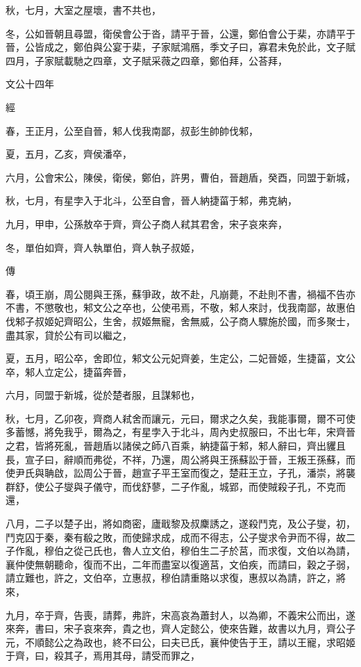 \documentclass{ctexart}
\begin{document}
秋，七月，大室之屋壞，書不共也，

冬，公如晉朝且尋盟，衛侯會公于沓，請平于晉，公還，鄭伯會公于棐，亦請平于晉，公皆成之，鄭伯與公宴于棐，子家賦鴻鴈，季文子曰，寡君未免於此，文子賦四月，子家賦載馳之四章，文子賦采薇之四章，鄭伯拜，公荅拜，





文公十四年


經



春，王正月，公至自晉，邾人伐我南鄙，叔彭生帥帥伐邾，

夏，五月，乙亥，齊侯潘卒，

六月，公會宋公，陳侯，衛侯，鄭伯，許男，曹伯，晉趙盾，癸酉，同盟于新城，

秋，七月，有星孛入于北斗，公至自會，晉人納捷菑于邾，弗克納，

九月，甲申，公孫敖卒于齊，齊公子商人弒其君舍，宋子哀來奔，

冬，單伯如齊，齊人執單伯，齊人執子叔姬，

傳



春，頃王崩，周公閱與王孫，蘇爭政，故不赴，凡崩薨，不赴則不書，禍福不告亦不書，不懲敬也，邾文公之卒也，公使弔焉，不敬，邾人來討，伐我南鄙，故惠伯伐邾子叔姬妃齊昭公，生舍，叔姬無寵，舍無威，公子商人驟施於國，而多聚士，盡其家，貸於公有司以繼之，

夏，五月，昭公卒，舍即位，邾文公元妃齊姜，生定公，二妃晉姬，生捷菑，文公卒，邾人立定公，捷菑奔晉，

六月，同盟于新城，從於楚者服，且謀邾也，

秋，七月，乙卯夜，齊商人弒舍而讓元，元曰，爾求之久矣，我能事爾，爾不可使多蓄憾，將免我乎，爾為之，有星孛入于北斗，周內史叔服曰，不出七年，宋齊晉之君，皆將死亂，晉趙盾以諸侯之師八百乘，納捷菑于邾，邾人辭曰，齊出貜且長，宣子曰，辭順而弗從，不祥，乃還，周公將與王孫蘇訟于晉，王叛王孫蘇，而使尹氏與聃啟，訟周公于晉，趙宣子平王室而復之，楚莊王立，子孔，潘崇，將襲群舒，使公子燮與子儀守，而伐舒蓼，二子作亂，城郢，而使賊殺子孔，不克而還，

八月，二子以楚子出，將如商密，廬戢黎及叔麇誘之，遂殺鬥克，及公子燮，初，鬥克囚于秦，秦有殽之敗，而使歸求成，成而不得志，公子燮求令尹而不得，故二子作亂，穆伯之從己氏也，魯人立文伯，穆伯生二子於莒，而求復，文伯以為請，襄仲使無朝聽命，復而不出，二年而盡室以復適莒，文伯疾，而請曰，穀之子弱，請立難也，許之，文伯卒，立惠叔，穆伯請重賂以求復，惠叔以為請，許之，將來，

九月，卒于齊，告喪，請葬，弗許，宋高哀為蕭封人，以為卿，不義宋公而出，遂來奔，書曰，宋子哀來奔，貴之也，齊人定懿公，使來告難，故書以九月，齊公子元，不順懿公之為政也，終不曰公，曰夫已氏，襄仲使告于王，請以王寵，求昭姬于齊，曰，殺其子，焉用其母，請受而罪之，
\end{document}

